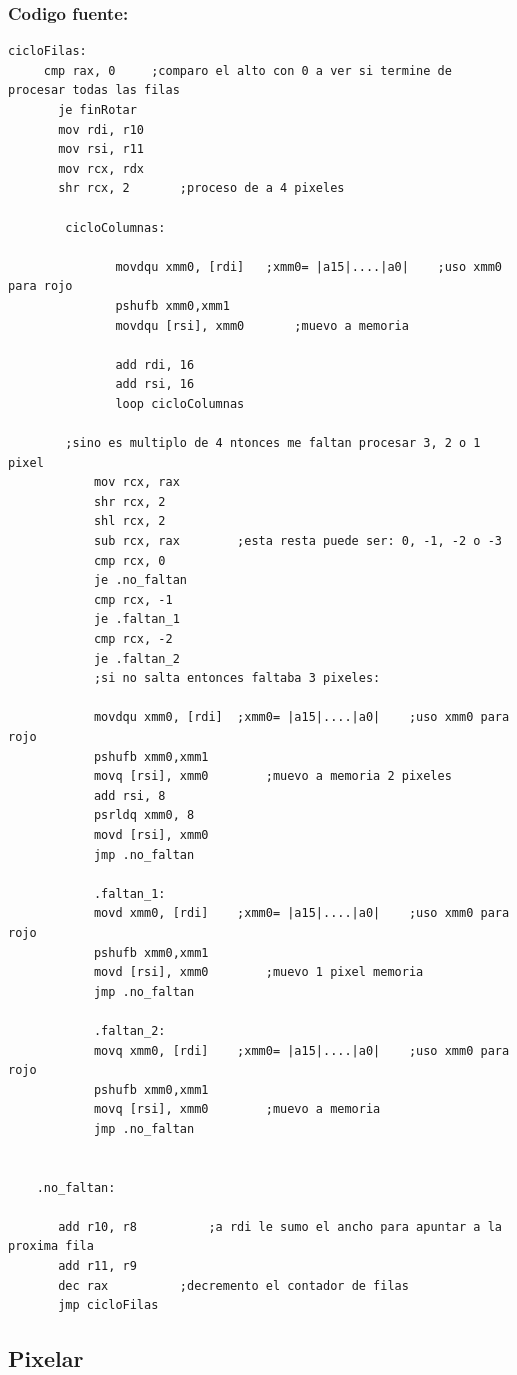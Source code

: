 \documentclass[a4paper]{article}
\newenvironment{codesnippet}{%
	\begin{Sbox}\begin{minipage}{\textwidth}\sffamily\small}%
	{\end{minipage}\end{Sbox}%
		\begin{center}%
		\vspace{-0.4cm}\colorbox{litegrey}{\TheSbox}\end{center}\vspace{0.3cm}}
\begin{document}
\subsubsection*{Codigo fuente:}
\begin{codesnippet}
\begin{internallinenumbers}
\begin{verbatim}
cicloFilas:	  
  	 cmp rax, 0		;comparo el alto con 0 a ver si termine de procesar todas las filas	
	   je finRotar
	   mov rdi, r10
	   mov rsi, r11
	   mov rcx, rdx
	   shr rcx, 2		;proceso de a 4 pixeles

		cicloColumnas:

			   movdqu xmm0, [rdi]	;xmm0= |a15|....|a0|	;uso xmm0 para rojo
			   pshufb xmm0,xmm1
			   movdqu [rsi], xmm0		;muevo a memoria	

			   add rdi, 16
			   add rsi, 16			
			   loop	cicloColumnas

		;sino es multiplo de 4 ntonces me faltan procesar 3, 2 o 1 pixel
			mov rcx, rax
			shr rcx, 2
			shl rcx, 2
			sub rcx, rax		;esta resta puede ser: 0, -1, -2 o -3
			cmp rcx, 0
			je .no_faltan
			cmp rcx, -1
			je .faltan_1
			cmp rcx, -2
			je .faltan_2
			;si no salta entonces faltaba 3 pixeles:
			
			movdqu xmm0, [rdi]	;xmm0= |a15|....|a0|	;uso xmm0 para rojo
			pshufb xmm0,xmm1
			movq [rsi], xmm0		;muevo a memoria 2 pixeles
			add rsi, 8
			psrldq xmm0, 8
			movd [rsi], xmm0
			jmp .no_faltan
			
			.faltan_1:
			movd xmm0, [rdi]	;xmm0= |a15|....|a0|	;uso xmm0 para rojo
			pshufb xmm0,xmm1
			movd [rsi], xmm0		;muevo 1 pixel memoria	
			jmp .no_faltan
			
			.faltan_2:
			movq xmm0, [rdi]	;xmm0= |a15|....|a0|	;uso xmm0 para rojo
			pshufb xmm0,xmm1
			movq [rsi], xmm0		;muevo a memoria
			jmp .no_faltan	
			

	.no_faltan:

	   add r10, r8			;a rdi le sumo el ancho para apuntar a la proxima fila
	   add r11, r9
	   dec rax			;decremento el contador de filas
	   jmp cicloFilas
\end{verbatim}
\end{internallinenumbers}
\end{codesnippet}
\clearpage

\subsection{Pixelar}
\end{document}
